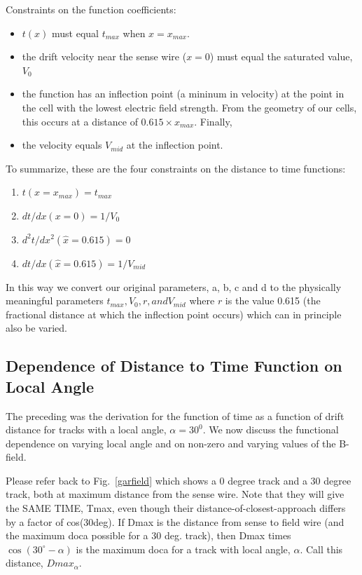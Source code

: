 Constraints on the function coefficients:
\begin{itemize}
\item  $t(x)$ must equal $t_{max}$ when $x = x_{max} $.
\item  the drift velocity near the sense wire ($x = 0$)
must equal the saturated value, $V_0$
\item the function has an inflection point (a
mininum in velocity) at the point in the cell with the lowest electric field
strength.  From the geometry of our cells, this occurs at a distance
of $ 0.615 \times x_{max}$.  Finally,
\item the velocity equals $V_{mid}$ at the inflection point.
\end{itemize}

To summarize, these are the four constraints on the distance to time functions:
\begin{enumerate}
\item $t(x = x_{max}) = t_{max}$
\item $dt / dx (x = 0) = 1 / V_0$
\item $d^2 t / dx^2 (\hat{x} = 0.615 ) = 0$   
\item $dt / dx (\hat{x} = 0.615 ) = 1/V_{mid}$  
\end{enumerate}

In this way we convert our original parameters, a, b, c and d to the physically meaningful
parameters $t_{max}, V_0, r, and V_{mid}$ where $r$ is the value 0.615 (the fractional distance
at which the inflection point occurs) which can in principle also be varied.


\subsection{Dependence of Distance to Time Function on Local Angle}
\noindent
The preceding was the derivation for the function of time as a function
of drift distance for tracks with a local angle, $\alpha = 30^0$.  
We now discuss the
functional dependence on varying local angle and on non-zero and varying
values of the B-field.

Please refer back to Fig.~\ref{garfield} which shows a 0 degree track and a 30 degree
track, both at maximum distance from the sense wire.  Note that they will give the
SAME TIME, Tmax, even though their distance-of-closest-approach differs by a factor
of cos(30deg).  If Dmax is the distance from sense to field wire (and the maximum
doca possible for a 30 deg. track), then Dmax times $\cos(30^\circ-\alpha)$ is the maximum
doca for a track with local angle, $\alpha$.  Call this distance, $Dmax_{\alpha}$.

